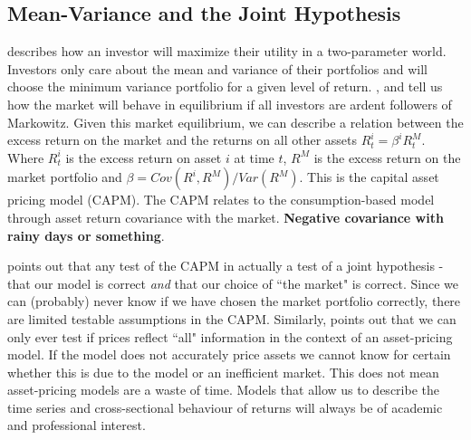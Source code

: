 
\subsection{Mean-Variance and the Joint Hypothesis}

\textcite{markowitz1952portfolio} describes how an investor will maximize their utility in a 
two-parameter world.
Investors only care about the mean and variance of their portfolios and will choose the 
minimum variance portfolio for a given level of return.
\textcite{sharpe1964capital}, \textcite{lintner1965valuation} and \textcite{black1972capital} 
tell us how the market will behave in equilibrium if all investors are ardent followers of 
Markowitz.
Given this market equilibrium, we can describe a relation between the excess return on the 
market and the returns on all other assets $R_t^i = \beta^iR_t^M$.
Where $R_t^i$ is the excess return on asset $i$ at time $t$, $R^M$ is the excess return on the 
market portfolio and $\beta=Cov(R^i, R^M)/Var(R^M)$.
This is the capital asset pricing model (CAPM).
The CAPM relates to the consumption-based model through asset return covariance with the 
market.
\textbf{Negative covariance with rainy days or something}.

\textcite{roll1977critique} points out that any test of the CAPM in actually a test of a joint 
hypothesis - that our model is correct \emph{and} that our choice of ``the market" is correct.
Since we can (probably) never know if we have chosen the market portfolio correctly, there are 
limited testable assumptions in the CAPM.
Similarly, \textcite{fama1991efficient} points out that we can only ever test if prices 
reflect ``all" information in the context of an asset-pricing model.
If the model does not accurately price assets we cannot know for certain whether this is due 
to the model or an inefficient market.
This does not mean asset-pricing models are a waste of time.
Models that allow us to describe the time series and cross-sectional behaviour of returns will 
always be of academic and professional interest.

